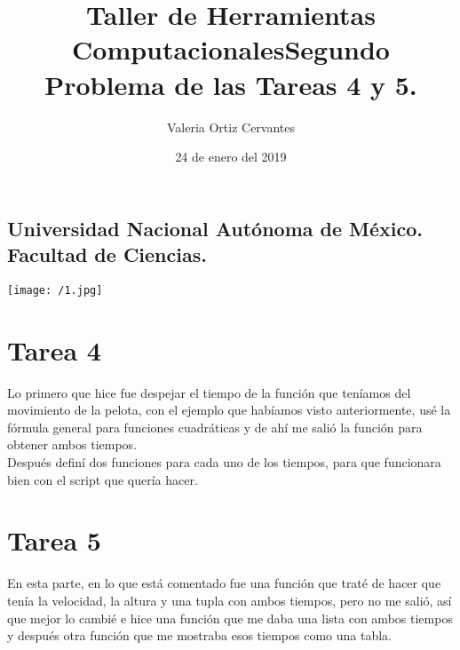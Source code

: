\documentclass{article} %
\title{\Huge Taller de Herramientas Computacionales}
\author{\huge Valeria Ortiz Cervantes}
\date{\LARGE 24 de enero del 2019}
\begin{document}
\maketitle
\begin{center}
	\subsection*{\LARGE Universidad Nacional Autónoma de México.\\Facultad de Ciencias.\\}
	\texttt{[image: /1.jpg]}
\end{center}
\newpage
\title{\LARGE Segundo Problema de las Tareas 4 y 5.}
\section*{\large Tarea 4}
	Lo primero que hice fue despejar el tiempo de la función que teníamos del movimiento de la pelota, con el ejemplo que habíamos visto anteriormente, usé la fórmula general para funciones cuadráticas y de ahí me salió la función para obtener ambos tiempos.\\	
	Después definí dos funciones para cada uno de los tiempos, para que funcionara bien con el script que quería hacer.
\section*{\large Tarea 5}
	En esta parte, en lo que está comentado fue una función que traté de hacer que tenía la velocidad, la altura y una tupla con ambos tiempos, pero no me salió, así que mejor lo cambié e hice una función que me daba una lista con ambos tiempos y después otra función que me mostraba esos tiempos como una tabla.
\end{document}
